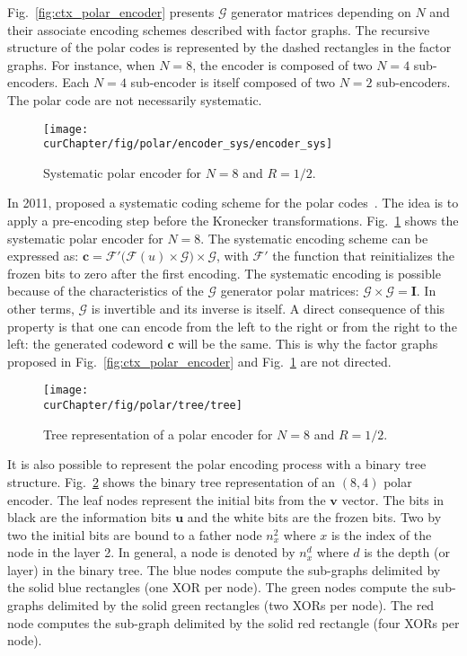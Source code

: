 Fig.~\ref{fig:ctx_polar_encoder} presents $\bm{\mathcal{G}}$ generator
matrices depending on $N$ and their associate encoding schemes described with
factor graphs. The recursive structure of the polar codes is represented by the
dashed rectangles in the factor graphs. For instance, when $N = 8$, the encoder
is composed of two $N = 4$ sub-encoders. Each $N = 4$ sub-encoder is itself
composed of two $N = 2$ sub-encoders. The polar code are not necessarily
systematic.

\begin{figure}[htp]
  \centering
  \texttt{[image: \\curChapter/fig/polar/encoder\_sys/encoder\_sys]}
  \caption{Systematic polar encoder for $N = 8$ and $R = 1/2$.}
  \label{fig:ctx_polar_encoder_sys}
\end{figure}

In 2011, \Arikan proposed a systematic coding scheme for the polar
codes~\cite{Arikan2011}. The idea is to apply a pre-encoding step before the
Kronecker transformations. Fig.~\ref{fig:ctx_polar_encoder_sys} shows the
systematic polar encoder for $N = 8$. The systematic encoding scheme can be
expressed as: $\bm{c} = \mathcal{F'}\big(\mathcal{F}(u) \times
\bm{\mathcal{G}}\big) \times \bm{\mathcal{G}}$, with $\mathcal{F'}$ the function
that reinitializes the frozen bits to zero after the first encoding. The
systematic encoding is possible because of the characteristics of the
$\bm{\mathcal{G}}$ generator polar matrices: $\bm{\mathcal{G}} \times
\bm{\mathcal{G}} = \bm{I}$. In other terms, $\bm{\mathcal{G}}$ is invertible and
its inverse is itself. A direct consequence of this property is that one can
encode from the left to the right or from the right to the left: the generated
codeword $\bm{c}$ will be the same. This is why the factor graphs proposed in
Fig.~\ref{fig:ctx_polar_encoder} and Fig.~\ref{fig:ctx_polar_encoder_sys} are
not directed.

\begin{figure}[htp]
  \centering
  \texttt{[image: \\curChapter/fig/polar/tree/tree]}
  \caption{Tree representation of a polar encoder for $N = 8$ and $R = 1/2$.}
  \label{fig:ctx_polar_tree}
\end{figure}

It is also possible to represent the polar encoding process with a binary tree
structure. Fig.~\ref{fig:ctx_polar_tree} shows the binary tree representation of
an $(8,4)$ polar encoder. The leaf nodes represent the initial bits from the
$\bm{v}$ vector. The bits in black are the information bits $\bm{u}$ and the
white bits are the frozen bits. Two by two the initial bits are bound to a
father node $n_x^2$ where $x$ is the index of the node in the layer 2. In
general, a node is denoted by $n_x^d$ where $d$ is the depth (or layer) in the
binary tree. The {\color{Paired-1} blue} nodes compute the sub-graphs delimited
by the solid {\color{Paired-1} blue} rectangles (one XOR per node). The
{\color{Paired-3} green} nodes compute the sub-graphs delimited by the solid
{\color{Paired-3} green} rectangles (two XORs per node). The {\color{Paired-5}
red} node computes the sub-graph delimited by the solid {\color{Paired-5} red}
rectangle (four XORs per node).

